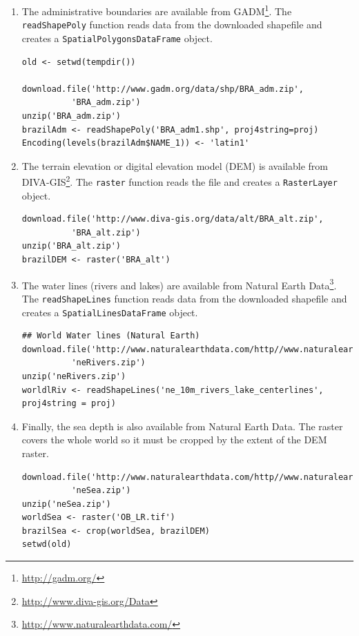\begin{enumerate}
\item The administrative boundaries are available from GADM\footnote{\url{http://gadm.org/}}. The
\texttt{readShapePoly} function reads data from the downloaded shapefile
and creates a \texttt{SpatialPolygonsDataFrame} object.
\lstset{language=R,numbers=none}
\begin{lstlisting}
old <- setwd(tempdir())

download.file('http://www.gadm.org/data/shp/BRA_adm.zip',
	      'BRA_adm.zip')
unzip('BRA_adm.zip')
brazilAdm <- readShapePoly('BRA_adm1.shp', proj4string=proj)
Encoding(levels(brazilAdm$NAME_1)) <- 'latin1'
\end{lstlisting}

\item The terrain elevation or digital elevation model (DEM) is
available from DIVA-GIS\footnote{\url{http://www.diva-gis.org/Data}}. The \texttt{raster} function reads the
file and creates a \texttt{RasterLayer} object.
\lstset{language=R,numbers=none}
\begin{lstlisting}
download.file('http://www.diva-gis.org/data/alt/BRA_alt.zip',
	      'BRA_alt.zip')
unzip('BRA_alt.zip')
brazilDEM <- raster('BRA_alt')
\end{lstlisting}
\item The water lines (rivers and lakes) are available from Natural
Earth Data\footnote{\url{http://www.naturalearthdata.com/}}. The \texttt{readShapeLines} function reads data from
the downloaded shapefile and creates a \texttt{SpatialLinesDataFrame}
object.
\lstset{language=R,numbers=none}
\begin{lstlisting}
## World Water lines (Natural Earth)
download.file('http://www.naturalearthdata.com/http//www.naturalearthdata.com/download/10m/physical/ne_10m_rivers_lake_centerlines.zip',
	      'neRivers.zip')
unzip('neRivers.zip')
worldlRiv <- readShapeLines('ne_10m_rivers_lake_centerlines', proj4string = proj)
\end{lstlisting}
\item Finally, the sea depth is also available from Natural Earth
Data\footnotemark[5]{}. The raster covers the whole world so it must be
cropped by the extent of the DEM raster.
\lstset{language=R,numbers=none}
\begin{lstlisting}
download.file('http://www.naturalearthdata.com/http//www.naturalearthdata.com/download/10m/raster/OB_LR.zip',
	      'neSea.zip')
unzip('neSea.zip')
worldSea <- raster('OB_LR.tif')
brazilSea <- crop(worldSea, brazilDEM)
setwd(old)
\end{lstlisting}
\end{enumerate}
